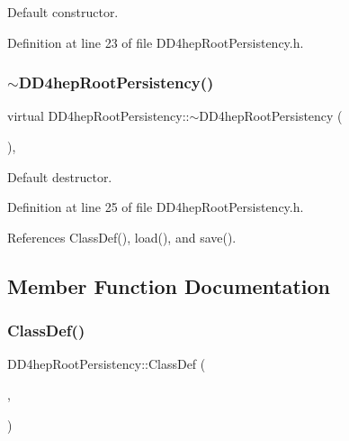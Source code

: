 Default constructor. 



Definition at line 23 of file D\+D4hep\+Root\+Persistency.\+h.

\hypertarget{class_d_d4hep_root_persistency_a3abaa5bb63ce254a41b17df3d78fc005}{}\label{class_d_d4hep_root_persistency_a3abaa5bb63ce254a41b17df3d78fc005} 
\subsubsection{\texorpdfstring{$\sim$\+D\+D4hep\+Root\+Persistency()}{~DD4hepRootPersistency()}}
{\footnotesize\ttfamily virtual D\+D4hep\+Root\+Persistency\+::$\sim$\+D\+D4hep\+Root\+Persistency (\begin{DoxyParamCaption}{ }\end{DoxyParamCaption})\hspace{0.3cm}{\ttfamily [inline]}, {\ttfamily [virtual]}}



Default destructor. 



Definition at line 25 of file D\+D4hep\+Root\+Persistency.\+h.



References Class\+Def(), load(), and save().



\subsection{Member Function Documentation}
\hypertarget{class_d_d4hep_root_persistency_af47b83fcc3468d2e8fca243d2cac8758}{}\label{class_d_d4hep_root_persistency_af47b83fcc3468d2e8fca243d2cac8758} 
\subsubsection{\texorpdfstring{Class\+Def()}{ClassDef()}}
{\footnotesize\ttfamily D\+D4hep\+Root\+Persistency\+::\+Class\+Def (\begin{DoxyParamCaption}\item[{\hyperlink{class_d_d4hep_root_persistency}{D\+D4hep\+Root\+Persistency}}]{,  }\item[{1}]{ }\end{DoxyParamCaption})}



